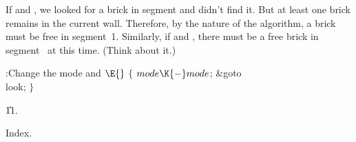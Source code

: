 If  and , we looked
for a brick in segment 
and didn't find it. But at least one brick remains in the current
wall. Therefore, by the nature of the algorithm, a brick must
be free in segment~1. Similarly, if  and , there
must be a free brick in segment~ at this time. (Think about it.)

\Y\B\4:Change the mode and \X${}\E{}$\6
${}\{{}$\1\6
${}\\{mode}\K{-}\\{mode}{}$;\5
\&{goto} \\{look};\6
\4${}\}{}$\2\par
\U11.\fi

Index.
\fi

\inx
\fin
\con

